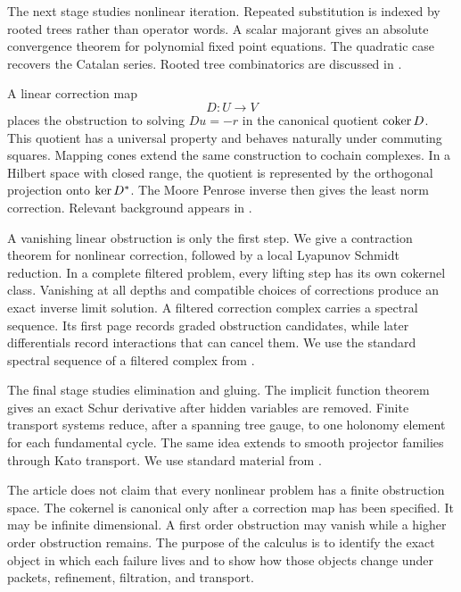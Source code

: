 The next stage studies nonlinear iteration.  Repeated substitution is indexed by rooted trees rather than operator words.  A scalar majorant gives an absolute convergence theorem for polynomial fixed point equations.  The quadratic case recovers the Catalan series.  Rooted tree combinatorics are discussed in \cite{Stanley2012,LodayVallette2012,HairerLubichWanner2006}.

A linear correction map
\[
D:U\longrightarrow V
\]
places the obstruction to solving $Du=-r$ in the canonical quotient $\operatorname{coker} D$.  This quotient has a universal property and behaves naturally under commuting squares.  Mapping cones extend the same construction to cochain complexes.  In a Hilbert space with closed range, the quotient is represented by the orthogonal projection onto $\operatorname{ker} D^*$.  The Moore Penrose inverse then gives the least norm correction.  Relevant background appears in \cite{Weibel1994,Penrose1955}.

A vanishing linear obstruction is only the first step.  We give a contraction theorem for nonlinear correction, followed by a local Lyapunov Schmidt reduction.  In a complete filtered problem, every lifting step has its own cokernel class.  Vanishing at all depths and compatible choices of corrections produce an exact inverse limit solution.  A filtered correction complex carries a spectral sequence.  Its first page records graded obstruction candidates, while later differentials record interactions that can cancel them.  We use the standard spectral sequence of a filtered complex from \cite{Weibel1994,McCleary2001}.

The final stage studies elimination and gluing.  The implicit function theorem gives an exact Schur derivative after hidden variables are removed.  Finite transport systems reduce, after a spanning tree gauge, to one holonomy element for each fundamental cycle.  The same idea extends to smooth projector families through Kato transport.  We use standard material from \cite{Deimling1985,GrossTucker1987,Kato1950,Kato1995,KobayashiNomizu1963}.

The article does not claim that every nonlinear problem has a finite obstruction space.  The cokernel is canonical only after a correction map has been specified.  It may be infinite dimensional.  A first order obstruction may vanish while a higher order obstruction remains.  The purpose of the calculus is to identify the exact object in which each failure lives and to show how those objects change under packets, refinement, filtration, and transport.


